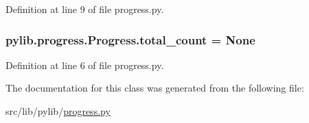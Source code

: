 Definition at line 9 of file progress.\+py.

\subsubsection[{\texorpdfstring{total\+\_\+count}{total_count}}]{\setlength{\rightskip}{0pt plus 5cm}pylib.\+progress.\+Progress.\+total\+\_\+count = None\hspace{0.3cm}{\ttfamily [static]}}\hypertarget{classpylib_1_1progress_1_1Progress_a52f5b22b6865612099802e716c147120}{}\label{classpylib_1_1progress_1_1Progress_a52f5b22b6865612099802e716c147120}


Definition at line 6 of file progress.\+py.



The documentation for this class was generated from the following file\+:\begin{DoxyCompactItemize}
\item 
src/lib/pylib/\hyperlink{progress_8py}{progress.\+py}\end{DoxyCompactItemize}
